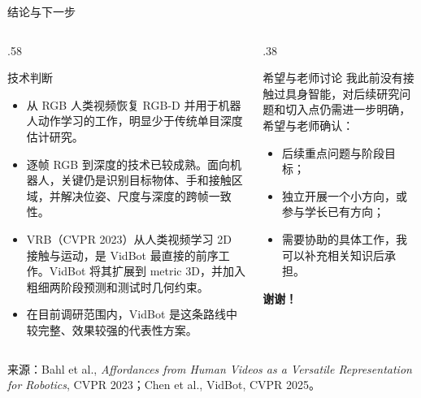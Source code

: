 \documentclass[aspectratio=169,10pt]{beamer}
\newcommand{\src}[1]{\vfill{\fontsize{5.8}{6.8}\selectfont\color{CUHKMidGray}来源：#1}}
\begin{document}
\begin{frame}{结论与下一步}
  \small
  \begin{columns}[T,onlytextwidth]
    \begin{column}{.58\textwidth}
      \begin{block}{技术判断}
        \begin{itemize}
          \item 从 RGB 人类视频恢复 RGB-D 并用于机器人动作学习的工作，明显少于传统单目深度估计研究。
          \item 逐帧 RGB 到深度的技术已较成熟。面向机器人，关键仍是识别目标物体、手和接触区域，并解决位姿、尺度与深度的跨帧一致性。
          \item VRB（CVPR 2023）从人类视频学习 2D 接触与运动，是 VidBot 最直接的前序工作。VidBot 将其扩展到 metric 3D，并加入粗细两阶段预测和测试时几何约束。
          \item 在目前调研范围内，VidBot 是这条路线中较完整、效果较强的代表性方案。
        \end{itemize}
      \end{block}
    \end{column}
    \begin{column}{.38\textwidth}
      \begin{alertblock}{希望与老师讨论}
        我此前没有接触过具身智能，对后续研究问题和切入点仍需进一步明确，希望与老师确认：
        \begin{itemize}
          \item 后续重点问题与阶段目标；
          \item 独立开展一个小方向，或参与学长已有方向；
          \item 需要协助的具体工作，我可以补充相关知识后承担。
        \end{itemize}
      \end{alertblock}
      \begin{center}
        {\Large\bfseries\color{CUHKDeepPurple}谢谢！}\par
        \vspace{.12cm}{\small 欢迎讨论}
      \end{center}
    \end{column}
  \end{columns}
  \src{Bahl et al., \textit{Affordances from Human Videos as a Versatile Representation for Robotics}, CVPR 2023；Chen et al., VidBot, CVPR 2025。}
\end{frame}
\end{document}
